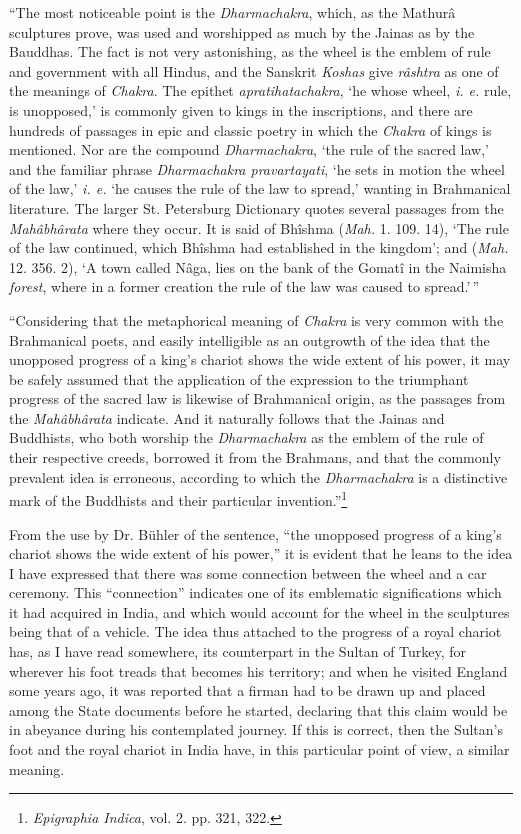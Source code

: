 \documentclass[a4paper, 11pt, oneside, polutonikogreek, english]{article}
\begin{document}
``The most noticeable point is the \emph{Dharmachakra}, which, as the Mathurâ sculptures prove, was used and worshipped as much by the Jainas as by the Bauddhas. The fact is not very astonishing, as the wheel is the emblem of rule and government with all Hindus, and the Sanskrit \emph{Koshas} give \emph{râshtra} as one of the meanings of \emph{Chakra}. The epithet \emph{apratihatachakra}, `he whose wheel, \emph{i. e.} rule, is unopposed,' is commonly given to kings in the inscriptions, and there are hundreds of passages in epic and classic poetry in which the \emph{Chakra} of kings is mentioned. Nor are the compound \emph{Dharmachakra}, `the rule of the sacred law,' and the familiar phrase \emph{Dharmachakra pravartayati}, `he sets in motion the wheel of the law,' \emph{i. e.} `he causes the rule of the law to spread,' wanting in Brahmanical literature. The larger St. Petersburg Dictionary quotes several passages from the \emph{Mahâbhârata} where they occur. It is said of Bhîshma (\emph{Mah.} 1. 109. 14), `The rule of the law continued, which Bhîshma had established in the kingdom'; and (\emph{Mah.} 12. 356. 2), `A town called Nâga, lies on the bank of the Gomatî in the Naimisha \emph{forest}, where in a former creation the rule of the law was caused to spread.'\,''

``Considering that the metaphorical meaning of \emph{Chakra} is very common with the Brahmanical poets, and easily intelligible as an outgrowth of the idea that the unopposed progress of a king's chariot shows the wide extent of his power, it may be safely assumed that the application of the expression to the triumphant progress of the sacred law is likewise of Brahmanical origin, as the passages from the \emph{Mahâbhârata} indicate. And it naturally follows that the Jainas and Buddhists, who both worship the \emph{Dharmachakra} as the emblem of the rule of their respective creeds, borrowed it from the Brahmans, and that the commonly prevalent idea is erroneous, according to which the \emph{Dharmachakra} is a distinctive mark of the Buddhists and their particular invention.''\footnote{\emph{Epigraphia Indica}, vol. 2. pp. 321, 322.}

From the use by Dr. Bühler of the sentence, ``the unopposed progress of a king's chariot shows the wide extent of his power,'' it is evident that he leans to the idea I have expressed that there was some connection between the wheel and a car ceremony. This ``connection'' indicates one of its emblematic significations which it had acquired in India, and which would account for the wheel in the sculptures being that of a vehicle. The idea thus attached to the progress of a royal chariot has, as I have read somewhere, its counterpart in the Sultan of Turkey, for wherever his foot treads that becomes his territory; and when he visited England some years ago, it was reported that a firman had to be drawn up and placed among the State documents before he started, declaring that this claim would be in abeyance during his contemplated journey. If this is correct, then the Sultan's foot and the royal chariot in India have, in this particular point of view, a similar meaning.
\end{document}

